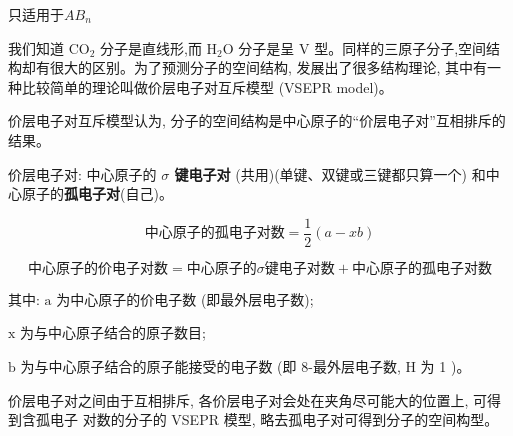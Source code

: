 \documentclass[10pt,cn]{elegantbook}
\begin{document}
只适用于$AB_{n}$

我们知道 \({\mathrm{{CO}}}_{2}\) 分子是直线形,而 \({\mathrm{H}}_{2}\mathrm{O}\) 分子是呈 \(\mathrm{V}\) 型。同样的三原子分子,空间结构却有很大的区别。为了预测分子的空间结构, 发展出了很多结构理论, 其中有一种比较简单的理论叫做价层电子对互斥模型 (VSEPR model)。

价层电子对互斥模型认为, 分子的空间结构是中心原子的“价层电子对”互相排斥的结果。

价层电子对: 中心原子的\textbf{ \(\sigma\) 键电子对} (共用)(单键、双键或三键都只算一个) 和中心原子的\textbf{孤电子对}(自己)。

$$ \text{中心原子的孤电子对数} = \frac{1}{2}\left( {a - {xb}}\right)$$

$$ \text{中心原子的价电子对数} = \text{中心原子的} \sigma \text{键电子对数} + \text{中心原子的孤电子对数}$$

其中: \(\mathrm{a}\) 为中心原子的价电子数 (即最外层电子数);

\(\mathrm{x}\) 为与中心原子结合的原子数目;

\(\mathrm{b}\) 为与中心原子结合的原子能接受的电子数 (即 8-最外层电子数, \(\mathrm{H}\) 为 1 )。


\begin{center}
\end{center}

	价层电子对之间由于互相排斥, 各价层电子对会处在夹角尽可能大的位置上, 可得到含孤电子	对数的分子的 VSEPR 模型, 略去孤电子对可得到分子的空间构型。
	
\end{document}
